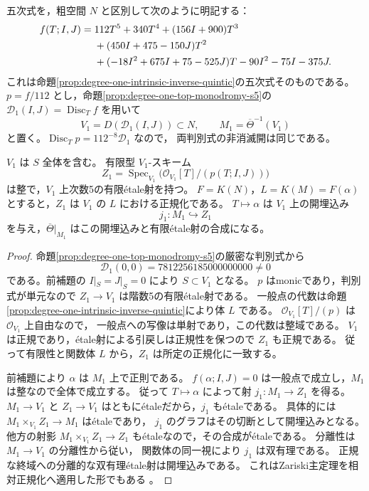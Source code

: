 五次式を，粗空間 $N$ と区別して次のように明記する：
\begin{align}
 f(T;I,J)={}&112T^5+340T^4+(156I+900)T^3\notag\\
 &+(450I+475-150J)T^2\notag\\
 &+(-18I^2+675I+75-525J)T-90I^2-75I-375J.
 \label{eq:degree-one-quintic-regular}
\end{align}
これは命題\ref{prop:degree-one-intrinsic-inverse-quintic}の五次式そのものである。
$p=f/112$ とし，命題\ref{prop:degree-one-top-monodromy-s5}の
$\mathscr D_1(I,J)=\operatorname{Disc}_T f$ を用いて
\[
 V_1=D(\mathscr D_1(I,J))\subset N,\qquad
 M_1=\overline\Theta^{-1}(V_1)
\]
と置く。$\operatorname{Disc}_T p=112^{-8}\mathscr D_1$ なので，
両判別式の非消滅開は同じである。

\begin{theorem}
\label{thm:degree-one-finite-normalization-zero}
$V_1$ は $S$ 全体を含む。
有限型 $V_1$-スキーム
\[
 Z_1=\operatorname{Spec}_{V_1}\bigl(\mathcal O_{V_1}[T]/(p(T;I,J))\bigr)
\]
は整で，$V_1$ 上次数5の有限\'{e}tale射を持つ。
$F=K(N)$，$L=K(M)=F(\alpha)$ とすると，$Z_1$ は $V_1$ の $L$ における正規化である。
$T\mapsto\alpha$ は $V_1$ 上の開埋込み
\[
                         j_1:M_1\hookrightarrow Z_1
\]
を与え，$\overline\Theta|_{M_1}$ はこの開埋込みと有限\'{e}tale射の合成になる。
\end{theorem}
\begin{proof}
命題\ref{prop:degree-one-top-monodromy-s5}の厳密な判別式から
\[
 \mathscr D_1(0,0)=7812256185000000000\ne0
\]
である。前補題の $I|_S=J|_S=0$ により $S\subset V_1$ となる。
$p$ はmonicであり，判別式が単元なので $Z_1\to V_1$ は階数5の有限\'{e}tale射である。
一般点の代数は命題\ref{prop:degree-one-intrinsic-inverse-quintic}により体 $L$ である。
$\mathcal O_{V_1}[T]/(p)$ は $\mathcal O_{V_1}$ 上自由なので，
一般点への写像は単射であり，この代数は整域である。
$V_1$ は正規であり，\'{e}tale射による引戻しは正規性を保つので
$Z_1$ も正規である\cite[Tag 034F]{StacksProject}。
従って有限性と関数体 $L$ から，$Z_1$ は所定の正規化に一致する。

前補題により $\alpha$ は $M_1$ 上で正則である。
$f(\alpha;I,J)=0$ は一般点で成立し，$M_1$ は整なので全体で成立する。
従って $T\mapsto\alpha$ によって射 $j_1:M_1\to Z_1$ を得る。
$M_1\to V_1$ と $Z_1\to V_1$ はともに\'{e}taleだから，$j_1$ も\'{e}taleである。
具体的には $M_1\times_{V_1}Z_1\to M_1$ は\'{e}taleであり，
$j_1$ のグラフはその切断として開埋込みとなる。
他方の射影 $M_1\times_{V_1}Z_1\to Z_1$ も\'{e}taleなので，その合成が\'{e}taleである。
分離性は $M_1\to V_1$ の分離性から従い，
関数体の同一視により $j_1$ は双有理である。
正規な終域への分離的な双有理\'{e}tale射は開埋込みである。
これはZariski主定理を相対正規化へ適用した形でもある
\cite[Tag 02LR]{StacksProject}。
\end{proof}

